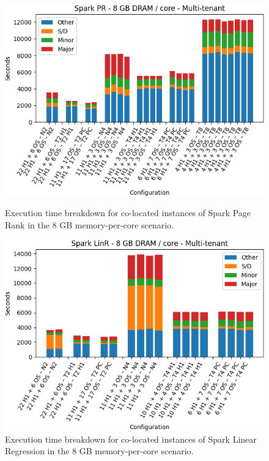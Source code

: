 \begin{figure}[thbp]
\centering
    \includegraphics[width=\linewidth]{./fig/pr64.png}
    \caption{Execution time breakdown for co-located instances of Spark
    Page Rank in the 8 GB memory-per-core scenario.}
    \label{fig:pr64}
	\includegraphics[width=\linewidth]{./fig/linr64.png}
    \caption{Execution time breakdown for co-located instances of Spark
    Linear Regression in the 8 GB memory-per-core scenario.}
    \label{fig:linr64}
\end{figure}

